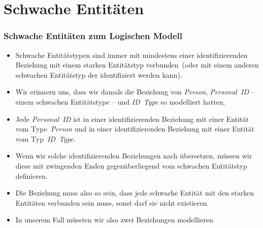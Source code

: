 \documentclass[aspectratio=169,mathserif,notheorems]{beamer}%
\begin{document}
\section{Schwache Entitäten}%
%
\begin{frame}[t]%
\frametitle{Schwache Entitäten zum Logischen Modell}%
\begin{itemize}%
%
\item Schwache Entitätstypen sind immer mit mindestens einer identifizierenden Beziehung mit einem starken Entitätstyp verbunden\cite{S2024D:MEDTRDM}~(oder mit einem anderen schwachen Entitätstyp der identifiziert werden kann).%
%
\item<2-> Wir erinnern uns, dass wir damals die Beziehung von \emph{Person}, \emph{Personal~ID} -- einem schwachen Entitätstype -- und \emph{ID~Type} so modelliert hatten.%
%
\item<3-> Jede \emph{Personal~ID} ist in einer identifizierenden Beziehung mit einer Entität vom Type~\emph{Person} und in einer identifizierenden Beziehung mit einer Entität vom Typ~\emph{ID~Type}.
%
\item<4-> Wenn wir solche identifizierenden Beziehungen nach  übersetzen, müssen wir diese mit zwingenden Enden gegenüberliegend vom schwachen Entitätstyp definieren.%
%
\item<5-> Die Beziehung muss also so sein, dass jede schwache Entität mit den starken Entitäten verbunden sein muss, sonst darf sie nicht existieren.%
%
\item<6-> In unserem Fall müssten wir also zwei Beziehungen modellieren%
\end{itemize}%
%
%
\end{frame}%
%
\end{document}
